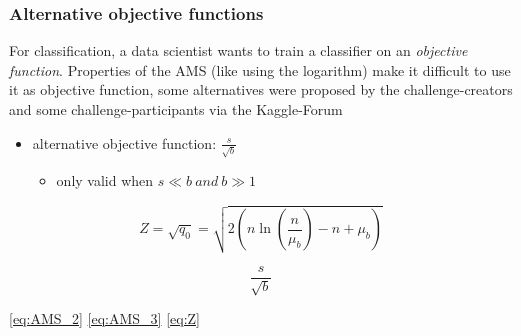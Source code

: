 \subsubsection{Alternative objective functions}
For classification, a data scientist wants to train a classifier on an \textit{objective function}. Properties of the AMS (like using the logarithm) make it difficult to use it as objective function, some alternatives were proposed by the challenge-creators \cite{higgsPaper} and some challenge-participants via the Kaggle-Forum \cite{higgsForum}

\begin{itemize}
	\item alternative objective function: $ \frac{s}{\sqrt{b}} $
	\begin{itemize}
		\item only valid when $s \ll b \ and \ b \gg 1$
	\end{itemize}
\end{itemize}



\begin{equation}\label{eq:Z}
	Z = \sqrt{q_0} = \sqrt{2 \left(n \ln{\left( \frac{n}{\mu_b} \right)} -
	n + \mu_b \right)}
\end{equation}

\begin{equation}\label{eq:AMS_3}
	\frac{s}{\sqrt{b}}
\end{equation}



\eqref{eq:AMS_2}
\eqref{eq:AMS_3}
\eqref{eq:Z}